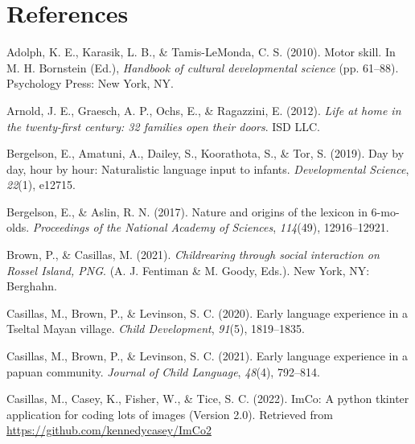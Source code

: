 \documentclass[10pt, letterpaper]{article}
\newenvironment{CSLReferences}%
  {}%
  {\par}
\begin{document}
\hypertarget{references}{%
\section{References}\label{references}}

\setlength{\parindent}{-0.1in} 
\setlength{\leftskip}{0.125in}

\noindent

\hypertarget{refs}{}
\begin{CSLReferences}{1}{0}
\leavevmode\hypertarget{ref-adolph2010motor}{}%
Adolph, K. E., Karasik, L. B., \& Tamis-LeMonda, C. S. (2010). Motor
skill. In M. H. Bornstein (Ed.), \emph{Handbook of cultural
developmental science} (pp. 61--88). Psychology Press: New York, NY.

\leavevmode\hypertarget{ref-arnold2012life}{}%
Arnold, J. E., Graesch, A. P., Ochs, E., \& Ragazzini, E. (2012).
\emph{Life at home in the twenty-first century: 32 families open their
doors}. ISD LLC.

\leavevmode\hypertarget{ref-bergelson2019day}{}%
Bergelson, E., Amatuni, A., Dailey, S., Koorathota, S., \& Tor, S.
(2019). Day by day, hour by hour: Naturalistic language input to
infants. \emph{Developmental Science}, \emph{22}(1), e12715.

\leavevmode\hypertarget{ref-bergelson2017nature}{}%
Bergelson, E., \& Aslin, R. N. (2017). Nature and origins of the lexicon
in 6-mo-olds. \emph{Proceedings of the National Academy of Sciences},
\emph{114}(49), 12916--12921.

\leavevmode\hypertarget{ref-brownIPchildrearing}{}%
Brown, P., \& Casillas, M. (2021). \emph{Childrearing through social
interaction on {Rossel Island, PNG}}. (A. J. Fentiman \& M. Goody,
Eds.). New York, NY: Berghahn.

\leavevmode\hypertarget{ref-casillas2020early}{}%
Casillas, M., Brown, P., \& Levinson, S. C. (2020). Early language
experience in a {Tseltal Mayan} village. \emph{Child Development},
\emph{91}(5), 1819--1835.

\leavevmode\hypertarget{ref-casillas2021early}{}%
Casillas, M., Brown, P., \& Levinson, S. C. (2021). Early language
experience in a papuan community. \emph{Journal of Child Language},
\emph{48}(4), 792--814.

\leavevmode\hypertarget{ref-casillas2022imco}{}%
Casillas, M., Casey, K., Fisher, W., \& Tice, S. C. (2022). ImCo: A
python tkinter application for coding lots of images (Version 2.0).
Retrieved from \url{https://github.com/kennedycasey/ImCo2}


\end{CSLReferences}
\end{document}
